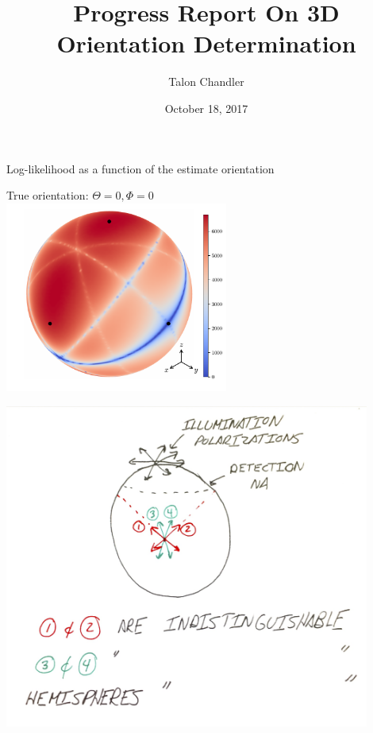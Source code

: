 \documentclass[presentation]{beamer}
\author{Talon Chandler}
\date{October 18, 2017}
\title{Progress Report On 3D Orientation Determination}
\begin{document}
\maketitle
\begin{frame}[label=sec-1]{Log-likelihood as a function of the estimate orientation}
\begin{center}
True orientation: $\Theta = 0, \Phi = 0$\\
  \includegraphics[width=0.55\textwidth, interpolate=true]{figs/likelihood2.pdf}\\
\end{center}
\end{frame}

\begin{frame}[label=sec-2]{}
\begin{center}
  \includegraphics[width=0.9\textwidth, interpolate=true]{figs/sketch1.png}\\
\end{center}
\end{frame}
\end{document}
